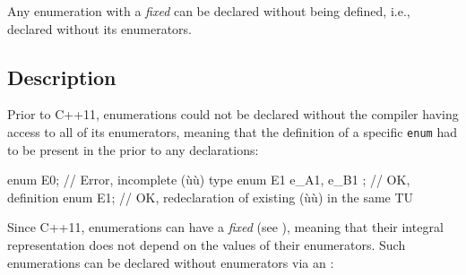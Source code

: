 

\label{opaque-enumeration-declarations}
\setcounter{table}{0}
\setcounter{footnote}{0}
\setcounter{lstlisting}{0}

Any enumeration with a \emph{fixed}  can be declared without being defined, i.e., declared without its enumerators. 


\subsection[Description]{Description}\label{description}

Prior to C++11, enumerations could not be declared without the compiler having access to all of its enumerators, meaning that the definition of a specific \lstinline!enum! had to be present in the  prior to any declarations:

\begin{emcppslisting}
enum E0;                 // Error, incomplete (ù{}ù) type
enum E1 { e_A1, e_B1 };  // OK, definition
enum E1;                 // OK, redeclaration of existing (ù{}ù) in the same TU
\end{emcppslisting}

Since C++11, enumerations can have a \emph{fixed}  (see ), meaning that their integral representation does not depend on the values of their enumerators.  Such enumerations can be declared without enumerators via an :

